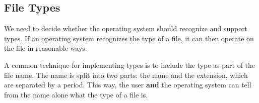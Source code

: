 \subsection{File Types}\label{subsec:File_Types}
We need to decide whether the operating system should recognize and support  types.
If an operating system recognizes the type of a file, it can then operate on the file in reasonable ways.

A common technique for implementing  types is to include the type as part of the file name.
The name is split into two parts: the name and the extension, which are separated by a period.
This way, the user \textbf{and} the operating system can tell from the name alone what the type of a file is.


